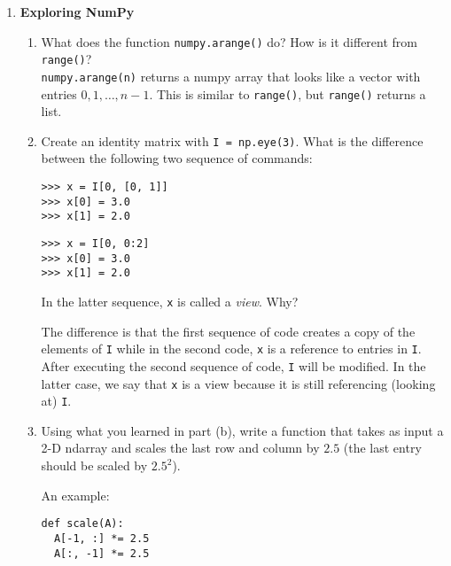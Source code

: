 \documentclass{article}
\begin{document}
\begin{enumerate}
\newpage
\item \textbf{Exploring NumPy}

\begin{enumerate}
\item What does the function \texttt{numpy.arange()} do? How is it different from \texttt{range()}? \\ \vspace{0.1in}
\texttt{numpy.arange(n)} returns a numpy array that looks like a vector with entries $0, 1, \hdots, n-1$.  This is similar to \texttt{range()}, but \texttt{range()} returns a list.
\end{enumerate}

\begin{enumerate}
\setcounter{enumii}{1}
\item Create an identity matrix with \texttt{I = np.eye(3)}.  What is the difference between the following two sequence of commands:
\begin{verbatim}
>>> x = I[0, [0, 1]]
>>> x[0] = 3.0
>>> x[1] = 2.0
\end{verbatim}

\vspace{0.1in}

\begin{verbatim}
>>> x = I[0, 0:2]
>>> x[0] = 3.0
>>> x[1] = 2.0
\end{verbatim}

In the latter sequence, \texttt{x} is called a \emph{view}.  Why? \\ \vspace{0.1in}

The difference is that the first sequence of code creates a copy of the elements of \texttt{I} while in the second code, \texttt{x} is a reference to entries in \texttt{I}.  After executing the second sequence of code, \texttt{I} will be modified.  In the latter case, we say that \texttt{x} is a view because it is still referencing (looking at) \texttt{I}.
\end{enumerate}

\begin{enumerate}
\setcounter{enumii}{2}
\item Using what you learned in part (b), write a function that takes as input a 2-D ndarray and scales the last row and column by $2.5$ (the last entry should be scaled by $2.5^2$). \\ \vspace{0.1in}

An example: \\
\begin{lstlisting}
def scale(A):
  A[-1, :] *= 2.5
  A[:, -1] *= 2.5
  

\end{lstlisting}
\end{enumerate}
\end{enumerate}
\end{document}
